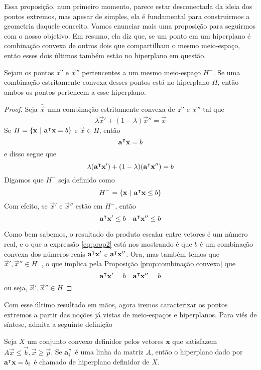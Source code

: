 Essa proposição, num primeiro momento, parece estar desconectada da ideia dos
pontos extremos, mas apesar de simples, ela é fundamental para construirmos
a geometria daquele conceito. Vamos enunciar mais uma proposição para
seguirmos com o nosso objetivo. Em resumo, ela diz que, se um ponto em um
hiperplano é combinação convexa de outros dois que compartilham o mesmo
meio-espaço, então esses dois últimos também estão no hiperplano em questão.

\begin{prop:hiperplano e ponto extremo}
	\label{prop:hiperplano e ponto extremo}
	Sejam os pontos $\vec{x}'$ e $\vec{x}''$ pertencentes a um mesmo
	meio-espaço $H^-$. Se uma combinação estritamente convexa desses pontos
	está no hiperplano $H$, então ambos os pontos pertencem a esse hiperplano.

	\begin{proof}
		Seja $\bar{\vec{x}}$ uma combinação estritamente convexa de $\vec{x}'$ e $\vec{x}''$ tal que
		\[\lambda \vec{x}' + (1 - \lambda) \vec{x}'' = 		\bar{\vec{x}}\]
		Se $H = \{\mathbf{x}\ |\ \mathbf{a}^\intercal\mathbf{x} = b\}$ e $\bar{\vec{x}} \in H$, então
		\[\mathbf{a}^\intercal\bar{\mathbf{x}} = b\]
		e disso segue que
		\begin{equation}
			\label{eq:prop2}
			\lambda (\mathbf{a}^\intercal\mathbf{x}') + (1 - \lambda) 	(\mathbf{a}^\intercal\mathbf{x}'') = b
		\end{equation}
		Digamos que $H^-$ seja definido como
		\[H^- = \{\vec{x}\ |\ \transp{a}\vec{x} \leq b\}\]
		Com efeito, se $\vec{x}'$ e $\vec{x}''$ estão em $H^-$, então
		\[\mathbf{a}^\intercal\mathbf{x}' \leq b \quad \mathbf{a}^\intercal\mathbf{x}'' \leq b\]


		Como bem sabemos, o resultado do produto escalar entre vetores é um
		número real, e o que a expressão \ref{eq:prop2} está nos mostrando é
		que $b$ é um combinação convexa dos números reais $\mathbf{a}^\intercal\mathbf{x}'$
		e $\mathbf{a}^\intercal\mathbf{x}''$. Ora, mas também temos que
		$\vec{x}', \vec{x}'' \in H^-$, o que implica pela Proposição
		\ref*{prop:combinação convexa} que
		\[\mathbf{a}^\intercal\mathbf{x}' = b \quad \mathbf{a}^\intercal\mathbf{x}'' = b\]
		ou seja, $\vec{x}', \vec{x}'' \in H$
	\end{proof}
\end{prop:hiperplano e ponto extremo}

Com esse último resultado em mãos, agora iremos caracterizar os pontos extremos
a partir das noções já vistas de meio-espaços e hiperplanos. Para viés de
síntese, admita a seguinte definição

\begin{def:hiperplano definidor}
  Seja $X$ um conjunto convexo definidor pelos vetores $\mathbf x$ que
  satisfazem $A \vec x \leq \vec b, \vec x \geq \vec p$. Se
  $\mathbf{a}^\intercal_i$ é uma linha da matriz $A$, então o hiperplano
  dado por $\mathbf{a}^\intercal \mathbf x = b_i$ é chamado de hiperplano
  definidor de $X$.
\end{def:hiperplano definidor}

